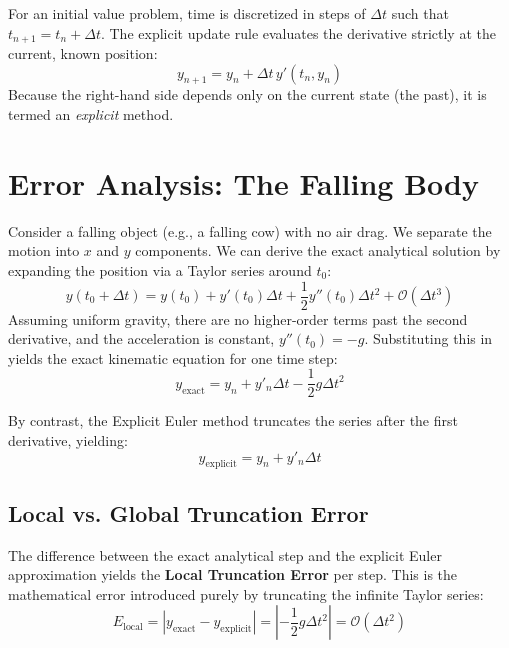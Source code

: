 \documentclass[11pt]{article}
\begin{document}
For an initial value problem, time is discretized in steps of $\Delta t$ such that $t_{n+1} = t_n + \Delta t$. The explicit update rule evaluates the derivative strictly at the current, known position:
\begin{equation}
    y_{n+1} = y_n + \Delta t \, y'(t_n, y_n)
\end{equation}
Because the right-hand side depends only on the current state (the past), it is termed an \textit{explicit} method.

\section{Error Analysis: The Falling Body}

Consider a falling object (e.g., a falling cow) with no air drag. We separate the motion into $x$ and $y$ components. We can derive the exact analytical solution by expanding the position via a Taylor series around $t_0$:
\begin{equation}
    y(t_0 + \Delta t) = y(t_0) + y'(t_0)\Delta t + \frac{1}{2}y''(t_0)\Delta t^2 + \mathcal{O}(\Delta t^3)
\end{equation}
Assuming uniform gravity, there are no higher-order terms past the second derivative, and the acceleration is constant, $y''(t_0) = -g$. Substituting this in yields the exact kinematic equation for one time step:
\begin{equation}
    y_{\text{exact}} = y_n + y'_n \Delta t - \frac{1}{2}g \Delta t^2
\end{equation}

By contrast, the Explicit Euler method truncates the series after the first derivative, yielding:
\begin{equation}
    y_{\text{explicit}} = y_n + y'_n \Delta t
\end{equation}

\subsection{Local vs. Global Truncation Error}
The difference between the exact analytical step and the explicit Euler approximation yields the \textbf{Local Truncation Error} per step. This is the mathematical error introduced purely by truncating the infinite Taylor series:
\begin{equation}
    E_{\text{local}} = \left| y_{\text{exact}} - y_{\text{explicit}} \right| = \left| -\frac{1}{2}g\Delta t^2 \right| = \mathcal{O}(\Delta t^2)
\end{equation}
\end{document}
